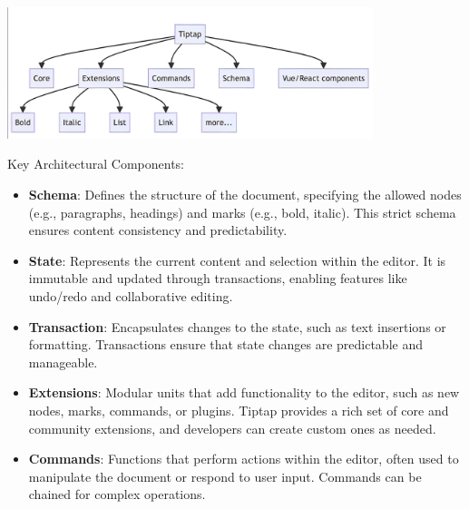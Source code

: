 \begin{center}
    \centering
    \includegraphics[width=0.8\textwidth]{Images/Tiptap Architecture.png}
     \cite{tiptapArchitecture}
    \label{fig:tiptapArchitecture}
\end{center}

Key Architectural Components:
\begin{itemize}
    \item \textbf{Schema}: Defines the structure of the document, specifying the allowed nodes (e.g., paragraphs, headings) and marks (e.g., bold, italic). This strict schema ensures content consistency and predictability.
    \item \textbf{State}: Represents the current content and selection within the editor. It is immutable and updated through transactions, enabling features like undo/redo and collaborative editing.
    \item \textbf{Transaction}: Encapsulates changes to the state, such as text insertions or formatting. Transactions ensure that state changes are predictable and manageable.
    \item \textbf{Extensions}: Modular units that add functionality to the editor, such as new nodes, marks, commands, or plugins. Tiptap provides a rich set of core and community extensions, and developers can create custom ones as needed.
    \item \textbf{Commands}: Functions that perform actions within the editor, often used to manipulate the document or respond to user input. Commands can be chained for complex operations.
\end{itemize}

